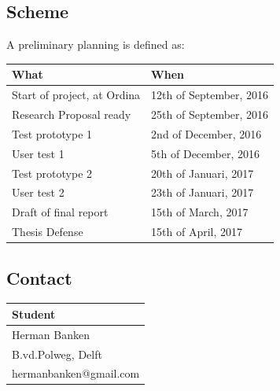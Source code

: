 \documentclass[11pt,a4paper]{article}
\begin{document}
\subsection{Scheme} A preliminary planning is defined as:
\begin{table}[h]
    \centering
    \begin{tabular}{@{}ll@{}}
        \textbf{What}               & \textbf{When}           \\ 
        \hline
        Start of project, at Ordina & 12th of September, 2016 \\ 
        Research Proposal ready     & 25th of September, 2016 \\ 
        \hline
        Test prototype 1            & 2nd of December, 2016   \\ 
        User test 1                 & 5th of December, 2016   \\ 
        \hline
        Test prototype 2            & 20th of Januari, 2017   \\ 
        User test 2                 & 23th of Januari, 2017   \\ 
        \hline
        Draft of final report       & 15th of March, 2017     \\ 
        \hline
        Thesis Defense              & 15th of April, 2017     \\ 
    \end{tabular}
\end{table}

\subsection{Contact}

\begin{table}[h]
    \centering
    \begin{tabular}{@{}l@{}}
        \textbf{Student}            \\ 
        \hline
        Herman Banken               \\ 
        B.vd.Polweg, Delft          \\ %
         
        hermanbanken@gmail.com      \\ 
    \end{tabular}
\end{table}
\end{document}
